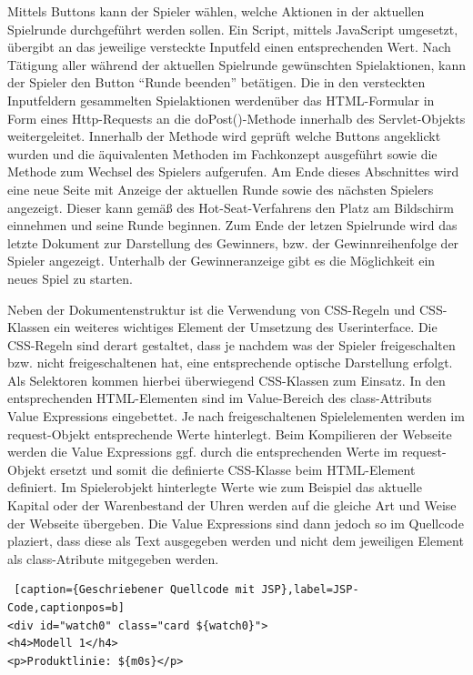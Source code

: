 Mittels Buttons kann der Spieler wählen, welche Aktionen in der aktuellen Spielrunde durchgeführt werden sollen. Ein Script, mittels JavaScript umgesetzt, übergibt an das jeweilige versteckte Inputfeld einen entsprechenden Wert.
Nach Tätigung aller während der aktuellen Spielrunde gewünschten Spielaktionen, kann der Spieler den Button \enquote{Runde beenden} betätigen. Die in den versteckten Inputfeldern gesammelten Spielaktionen werdenüber das HTML-Formular in Form eines Http-Requests an die doPost()-Methode innerhalb des Servlet-Objekts weitergeleitet. Innerhalb der Methode wird geprüft welche Buttons angeklickt wurden und die äquivalenten Methoden im Fachkonzept ausgeführt sowie die Methode zum Wechsel des Spielers aufgerufen. Am Ende dieses Abschnittes wird eine neue Seite mit Anzeige der aktuellen Runde sowie des nächsten Spielers angezeigt. Dieser kann gemäß des Hot-Seat-Verfahrens den Platz am Bildschirm einnehmen und seine Runde beginnen. Zum Ende der letzen Spielrunde wird das letzte Dokument zur Darstellung des Gewinners, bzw. der Gewinnreihenfolge der Spieler angezeigt. Unterhalb der Gewinneranzeige gibt es die Möglichkeit ein neues Spiel zu starten.

Neben der Dokumentenstruktur ist die Verwendung von CSS-Regeln und CSS-Klassen ein weiteres wichtiges Element der Umsetzung des Userinterface. Die CSS-Regeln sind derart gestaltet, dass je nachdem was der Spieler freigeschalten bzw. nicht freigeschaltenen hat, eine entsprechende optische Darstellung erfolgt. Als Selektoren kommen hierbei überwiegend CSS-Klassen zum Einsatz. In den entsprechenden HTML-Elementen sind im Value-Bereich des class-Attributs Value Expressions eingebettet. Je nach freigeschaltenen Spielelementen werden im request-Objekt entsprechende Werte hinterlegt. Beim Kompilieren der Webseite werden die Value Expressions ggf. durch die entsprechenden Werte im request-Objekt ersetzt und somit die definierte CSS-Klasse beim HTML-Element definiert. Im Spielerobjekt hinterlegte Werte wie zum Beispiel das aktuelle Kapital oder der Warenbestand der Uhren werden auf die gleiche Art und Weise der Webseite übergeben. Die Value Expressions sind dann jedoch so im Quellcode plaziert, dass diese als Text ausgegeben werden und nicht dem jeweiligen Element als class-Atribute mitgegeben werden.

\lstset{language=HTML}
\begin{lstlisting} [caption={Geschriebener Quellcode mit JSP},label=JSP-Code,captionpos=b]
<div id="watch0" class="card ${watch0}">
<h4>Modell 1</h4>
<p>Produktlinie: ${m0s}</p>
\end{lstlisting}

